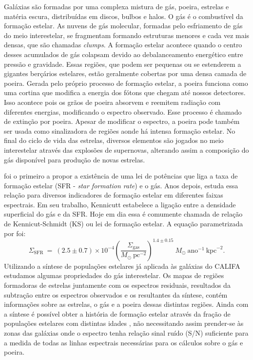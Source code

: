 Galáxias são formadas por uma complexa mistura de gás, poeira, estrelas e matéria escura,
distribuídas em discos, bulbos e halos. O gás é o combustível da formação estelar. As nuvens de gás
molecular, formadas pelo esfriamento de gás do meio interestelar, se fragmentam formando estruturas
menores e cada vez mais densas, que são chamadas {\em clumps}. A formação estelar acontece quando o
centro desses acumulados de gás colapsam devido ao debalanceamento energético entre pressão e
gravidade. Essas regiões, que podem ser pequenas ou se estenderem a gigantes berçários estelares,
estão geralmente cobertas por uma densa camada de poeira. Gerada pelo próprio processo de formação
estelar, a poeira funciona como uma cortina que modifica a energia dos fótons que chegam até nossos
detectores. Isso acontece pois os grãos de poeira absorvem e reemitem radiação com diferentes
energias, modificando o espectro observado. Esse processo é chamado de extinção por poeira. Apesar
de modificar o espectro, a poeira pode também ser usada como sinalizadora de regiões aonde há
intensa formação estelar. No final do ciclo de vida das estrelas, diversos elementos são jogados no
meio interestelar através das explosões de supernovas, alterando assim a composição do gás
disponível para produção de novas estrelas.

\citet{Schmidt.1959a} foi o primeiro a propor a existência de uma lei de potências que liga a taxa
de formação estelar (SFR - {\em star formation rate}) e o gás. Anos depois, \citet{Kennicutt.1998a}
estuda essa relação para diversos indicadores de formação estelar em diferentes faixas espectrais.
Em seu trabalho, Kennicutt estabelece a ligação entre a densidade superficial do gás e da SFR. Hoje
em dia essa é comumente chamada de relação de Kennicut-Schmidt (KS) ou lei de formação estelar. A
equação parametrizada por \citeauthor{Kennicutt.1998a} foi:
\begin{equation}
	\Sigma_{\mathrm{SFR}}\ =\ (2.5\pm0.7)\times 10^{-4} \left(\frac{\Sigma_{\mathrm{gas}}}{
M_\odot\ \mathrm{pc}^{-2}}\right)^{1.4 \pm 0.15}\ M_\odot\ \mathrm{ano}^{-1}\ \mathrm{kpc}^{-2}.
	\label{eq:SFRKennicutt}
\end{equation}
\noindent Utilizando a síntese de populações estelares já aplicada às galáxias do CALIFA estudamos
algumas propriedades do gás interestelar. Os mapas de regiões formadoras de estrelas juntamente com
os espectros residuais, resultados da subtração entre os espectros observados e os resultantes da
síntese, contém informações sobre as estrelas, o gás e a poeira dessas distintas regiões. Ainda com
a síntese é possível obter a história de formação estelar através da fração de populações estelares
com distintas idades \citep{Asari.etal.2007a}, não necessitando assim prender-se às zonas das
galáxias onde o espectro tenha relação sinal ruído (S/N) suficiente para a medida de todas as linhas
espectrais necessárias para os cálculos sobre o gás e poeira.

